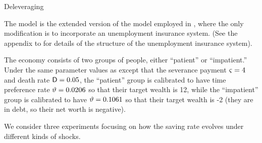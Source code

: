 \documentclass[titlepage,abstract,letterpaper]{bejournal}
\begin{document}
\begin{center}
\Large Deleveraging 
\end{center}

The model is the extended version of the \cite{ctDiscrete} model employed in \cite{cssUSSaving}, where the only modification is to incorporate an unemployment insurance system.  (See the appendix to \cite{cssUSSaving} for details of the structure of the unemployment insurance system).

The economy consists of two groups of people, either ``patient'' or ``impatient.'' Under the same parameter values as \cite{ctDiscrete} except that the severance payment $\varsigma=4$ and death rate $\mathsf{D}=0.05$, the ``patient'' group is calibrated to have time preference rate $\vartheta=0.0206$ so that their target wealth is 12, while the ``impatient'' group is calibrated to have $\vartheta=0.1061$ so that their target wealth is -2 (they are in debt, so their net worth is negative).

We consider three experiments focusing on how the saving rate evolves under different kinds of shocks.
\end{document}
